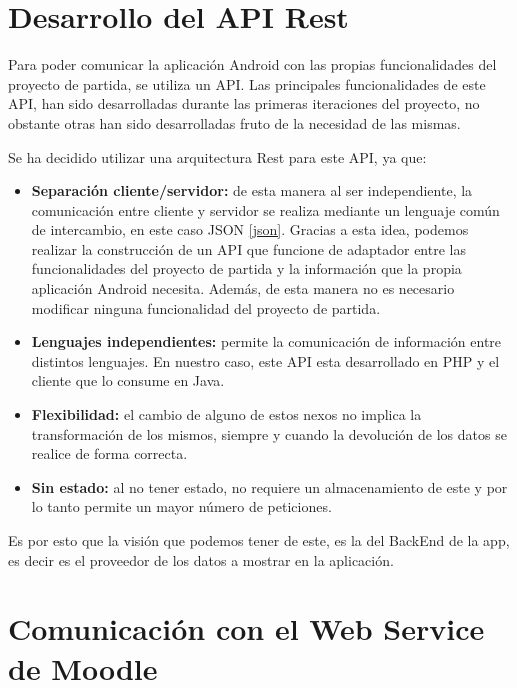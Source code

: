 \section{Desarrollo del API Rest}

Para poder comunicar la aplicación Android con las propias funcionalidades del proyecto de partida, se utiliza un API. Las principales funcionalidades de este API, han sido desarrolladas durante las primeras iteraciones del proyecto, no obstante otras han sido desarrolladas fruto de la necesidad de las mismas. 

Se ha decidido utilizar una arquitectura Rest para este API, ya que:

\begin{itemize}
	
	\item \textbf{Separación cliente/servidor:} de esta manera al ser independiente, la comunicación entre cliente y servidor se realiza mediante un lenguaje común de intercambio, en este caso JSON \ref{json}. Gracias a esta idea, podemos realizar la construcción de un API que funcione de adaptador entre las funcionalidades del proyecto de partida y la información que la propia aplicación Android necesita. Además, de esta manera no es necesario modificar ninguna funcionalidad del proyecto de partida.
	
	\item \textbf{Lenguajes independientes:} permite la comunicación de información entre distintos lenguajes. En nuestro caso, este API esta desarrollado en PHP y el cliente que lo consume en Java.
	
	\item \textbf{Flexibilidad:} el cambio de alguno de estos nexos no implica la transformación de los mismos, siempre y cuando la devolución de los datos se realice de forma correcta.
	
	\item \textbf{Sin estado:} al no tener estado, no requiere un almacenamiento de este y por lo tanto permite un mayor número de peticiones.

\end{itemize}

Es por esto que la visión que podemos tener de este, es la del BackEnd de la app, es decir es el proveedor de los datos a mostrar en la aplicación.

\section{Comunicación con el Web Service de Moodle}

